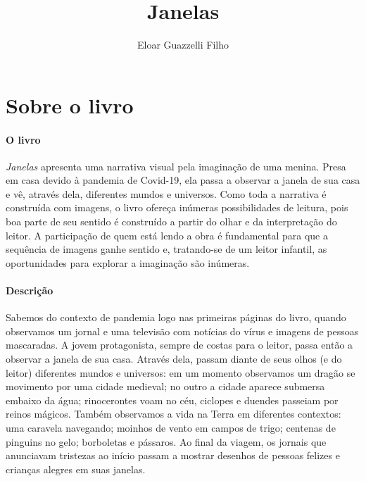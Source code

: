 \documentclass[11pt]{extarticle}
\newcommand{\AutorLivro}{Eloar Guazzelli Filho}
\newcommand{\TituloLivro}{Janelas}
\newcommand{\colaborador}{{Paulo Pompermaier e Renier Silva}}
\begin{document}
\title{\TituloLivro}
\author{\AutorLivro}
\def\authornotes{\colaborador}

\date{}
\maketitle


\tableofcontents



\section{Sobre o livro}

\paragraph{O livro} \textit{Janelas} apresenta uma narrativa visual pela imaginação de uma menina. Presa em casa devido à pandemia de Covid-19, ela passa a observar a janela de sua casa e vê, através dela, diferentes mundos e universos.
Como toda a narrativa é construída com imagens, o livro 
ofereça inúmeras possibilidades de leitura, pois boa parte de seu sentido é 
construído a partir do olhar e da interpretação do leitor. A participação de quem 
está lendo a obra é fundamental para que a sequência de imagens ganhe sentido e, 
tratando-se de um leitor infantil, as oportunidades para explorar a 
imaginação são inúmeras.

\paragraph{Descrição} Sabemos do contexto de pandemia logo nas primeiras páginas do livro, quando observamos um jornal e uma televisão com notícias do vírus e imagens de pessoas mascaradas. A jovem protagonista, sempre de costas para o leitor, passa então a observar a janela de sua casa. Através dela, passam diante de seus olhos (e do leitor) diferentes mundos e universos: em um momento observamos um dragão se movimento por uma cidade medieval; no outro a cidade aparece submersa embaixo da água; rinocerontes voam no céu, ciclopes e duendes passeiam por reinos mágicos. Também observamos a vida na Terra em diferentes contextos: uma caravela navegando; moinhos de vento em campos de trigo; centenas de pinguins no gelo; borboletas e pássaros. Ao final da viagem, os jornais que anunciavam tristezas ao início passam a mostrar desenhos de pessoas felizes e crianças alegres em suas janelas.
\end{document}
